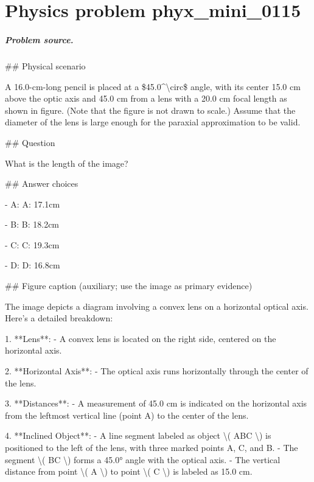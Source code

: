 
\chapter{Physics problem phyx\_mini\_0115}
\label{ch:PhyXMiniProblems_problem_phyx_mini_0115}

\paragraph{Problem source.}
\#\# Physical scenario

A 16.0-cm-long pencil is placed at a \$45.0\textasciicircum{}\textbackslash{}circ\$ angle, with its center 15.0 cm above the optic axis and 45.0 cm from a lens with a 20.0 cm focal length as shown in figure. (Note that the figure is not drawn to scale.) Assume that the diameter of the lens is large enough for the paraxial approximation to be valid.

\#\# Question

What is the length of the image?

\#\# Answer choices

- A: A: 17.1cm

- B: B: 18.2cm

- C: C: 19.3cm

- D: D: 16.8cm

\#\# Figure caption (auxiliary; use the image as primary evidence)

The image depicts a diagram involving a convex lens on a horizontal optical axis. Here's a detailed breakdown:

1. **Lens**: 
   - A convex lens is located on the right side, centered on the horizontal axis.

2. **Horizontal Axis**:
   - The optical axis runs horizontally through the center of the lens.

3. **Distances**:
   - A measurement of 45.0 cm is indicated on the horizontal axis from the leftmost vertical line (point A) to the center of the lens.

4. **Inclined Object**:
   - A line segment labeled as object \textbackslash{}( ABC \textbackslash{}) is positioned to the left of the lens, with three marked points A, C, and B.
   - The segment \textbackslash{}( BC \textbackslash{}) forms a 45.0° angle with the optical axis.
   - The vertical distance from point \textbackslash{}( A \textbackslash{}) to point \textbackslash{}( C \textbackslash{}) is labeled as 15.0 cm.


